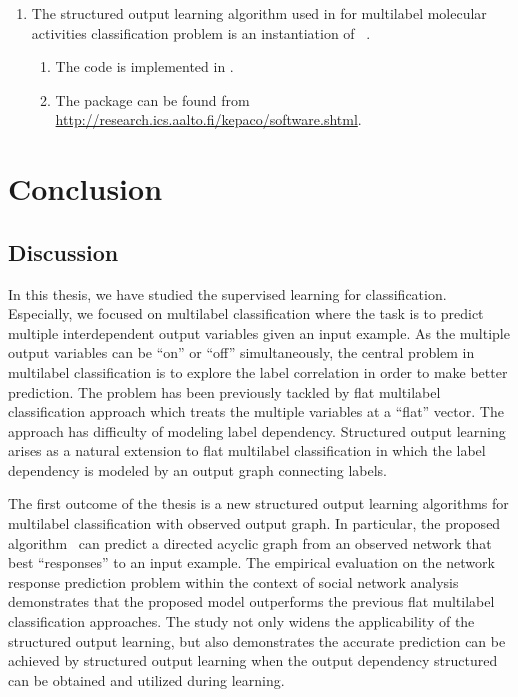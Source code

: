 {\begin{enumerate}
	\item The structured output learning algorithm used in  for multilabel molecular activities classification problem is an instantiation of \mmcrf\ \citep{Rousu07}.
	\begin{enumerate}
		\item The code is implemented in \matlab.
		\item The package can be found from \url{http://research.ics.aalto.fi/kepaco/software.shtml}.
	\end{enumerate}
\end{enumerate}




%
%
\chapter{Conclusion} \label{ch_conclusion}


\section{Discussion}

In this thesis, we have studied the supervised learning for classification.
Especially, we focused on multilabel classification where the task is to predict multiple interdependent output variables given an input example.
As the multiple output variables can be ``on'' or ``off'' simultaneously, the central problem in multilabel classification is to explore the label correlation in order to make better prediction.
The problem has been previously tackled by flat multilabel classification approach which treats the multiple variables at a ``flat'' vector.
The approach has difficulty of modeling label dependency.
Structured output learning arises as a natural extension to flat multilabel classification in which the label dependency is modeled by an output graph connecting labels.

The first outcome of the thesis is a new structured output learning algorithms for multilabel classification with observed output graph.
In particular, the proposed algorithm \spin\ can predict a directed acyclic graph from an observed network that best ``responses'' to an input example.
The empirical evaluation on the network response prediction problem within the context of social network analysis demonstrates that the proposed model outperforms the previous flat multilabel classification approaches.
The study not only widens the applicability of the structured output learning, but also demonstrates the accurate prediction can be achieved by structured output learning when the output dependency structured can be obtained and utilized during learning.

}
